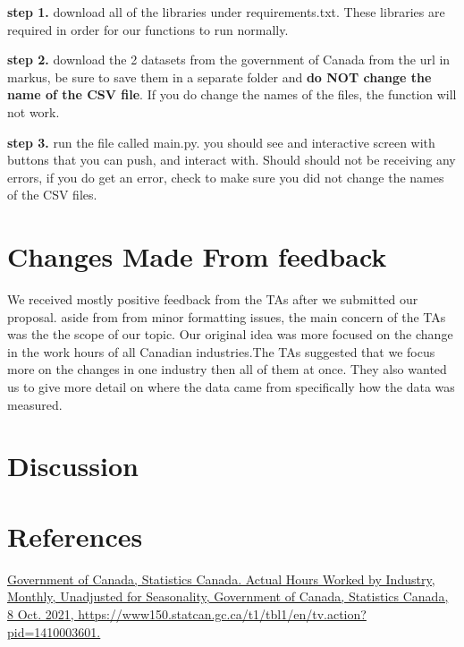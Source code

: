 \documentclass[fontsize=11pt]{article}
\begin{document}
\textbf{step 1.}
download all of the libraries under requirements.txt. These libraries are required in order for our functions to run normally.
 
\textbf{step 2.}
download the 2 datasets from the government of Canada from the url in markus, be sure to save them in a separate folder and \textbf{do NOT change the name of the CSV file}. If you do change the names of the files, the function will not work.
 
\textbf{step 3.} run the file called main.py. 
you should see and interactive screen with buttons that you can push, and interact with. Should should not be receiving any errors, if you do get an error, check to make sure you did not change the names of the CSV files.
 
\section*{Changes Made From feedback}  

We received mostly positive feedback from the TAs after we submitted our proposal. aside from from minor formatting issues, the main concern of the TAs was the the scope of our topic. Our original idea was more focused on the change in the work hours of all Canadian industries.The TAs suggested that we focus more on the changes in one industry then all of them at once. They also wanted us to give more detail on where the data came from specifically how the data was measured.
 
 
 
 
 
\section*{Discussion} 




\section{References}
 
\href{ https://www150.statcan.gc.ca/t1/tbl1/en/tv.action?pid=1410003601 }{ Government of Canada, Statistics Canada. Actual Hours Worked by Industry, Monthly, Unadjusted for Seasonality, Government of Canada, Statistics Canada, 8 Oct. 2021, https://www150.statcan.gc.ca/t1/tbl1/en/tv.action?pid=1410003601. } 

  
  
  
\end{document}
